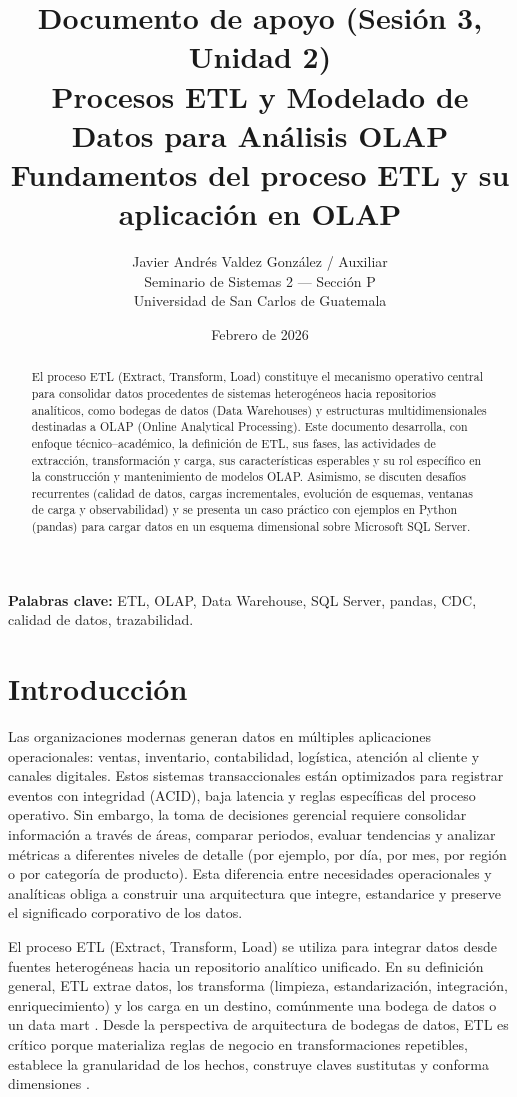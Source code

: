 \documentclass[12pt]{article}
\title{\textbf{Documento de apoyo (Sesión 3, Unidad 2)}\\
\large Procesos ETL y Modelado de Datos para Análisis OLAP\\
\normalsize Fundamentos del proceso ETL y su aplicación en OLAP}
\author{Javier Andrés Valdez González / Auxiliar \\
\small Seminario de Sistemas 2 — Sección P \\
\small Universidad de San Carlos de Guatemala}
\date{Febrero de 2026}
\begin{document}
\maketitle

\begin{abstract}
El proceso ETL (Extract, Transform, Load) constituye el mecanismo operativo central para consolidar datos procedentes de sistemas heterogéneos hacia repositorios analíticos, como bodegas de datos (Data Warehouses) y estructuras multidimensionales destinadas a OLAP (Online Analytical Processing). Este documento desarrolla, con enfoque técnico--académico, la definición de ETL, sus fases, las actividades de extracción, transformación y carga, sus características esperables y su rol específico en la construcción y mantenimiento de modelos OLAP. Asimismo, se discuten desafíos recurrentes (calidad de datos, cargas incrementales, evolución de esquemas, ventanas de carga y observabilidad) y se presenta un caso práctico con ejemplos en Python (pandas) para cargar datos en un esquema dimensional sobre Microsoft SQL Server.
\end{abstract}

\textbf{Palabras clave:} ETL, OLAP, Data Warehouse, SQL Server, pandas, CDC, calidad de datos, trazabilidad.

\newpage
\tableofcontents

\section{Introducción}
Las organizaciones modernas generan datos en múltiples aplicaciones operacionales: ventas, inventario, contabilidad, logística, atención al cliente y canales digitales. Estos sistemas transaccionales están optimizados para registrar eventos con integridad (ACID), baja latencia y reglas específicas del proceso operativo. Sin embargo, la toma de decisiones gerencial requiere consolidar información a través de áreas, comparar periodos, evaluar tendencias y analizar métricas a diferentes niveles de detalle (por ejemplo, por día, por mes, por región o por categoría de producto). Esta diferencia entre necesidades operacionales y analíticas obliga a construir una arquitectura que integre, estandarice y preserve el significado corporativo de los datos.

El proceso ETL (Extract, Transform, Load) se utiliza para integrar datos desde fuentes heterogéneas hacia un repositorio analítico unificado. En su definición general, ETL extrae datos, los transforma (limpieza, estandarización, integración, enriquecimiento) y los carga en un destino, comúnmente una bodega de datos o un data mart \cite{ibm_etl}. Desde la perspectiva de arquitectura de bodegas de datos, ETL es crítico porque materializa reglas de negocio en transformaciones repetibles, establece la granularidad de los hechos, construye claves sustitutas y conforma dimensiones \cite{kimball_etl_toolkit}.
\end{document}
